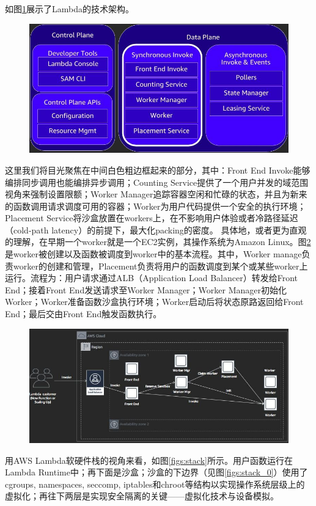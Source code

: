 \documentclass[11pt]{article}
\begin{document}
如图\ref{figs:block}展示了Lambda的技术架构。
\begin{figure}[!htbp]
	\centering
	\includegraphics[width=0.6\linewidth]{figs/internal}
	\caption{}
	\label{figs:block}
\end{figure}
这里我们将目光聚焦在中间白色粗边框起来的部分，其中：Front End Invoke能够编排同步调用也能编排异步调用；Counting Service提供了一个用户并发的域范围视角来强制设置限额；Worker Manager追踪容器空闲和忙碌的状态，并且为新来的函数调用请求调度可用的容器；Worker为用户代码提供一个安全的执行环境；Placement Service将沙盒放置在workers上，在不影响用户体验或者冷路径延迟（cold-path latency）的前提下，最大化packing的密度。
具体地，或者更为直观的理解，在早期一个worker就是一个EC2实例，其操作系统为Amazon Linux。图\ref{figs:worker}是worker被创建以及函数被调度到worker中的基本流程。其中，Worker manage负责worker的创建和管理，Placement负责将用户的函数调度到某个或某些worker上运行。流程为：用户请求通过ALB（Application Load Balancer）转发给Front End；接着Front End发送请求至Worker Manager；Worker Manager初始化Worker；Worker准备函数沙盒执行环境；Worker启动后将状态原路返回给Front End；最后交由Front End触发函数执行。
\begin{figure}[!htbp]
	\centering
	\includegraphics[width=0.8\linewidth]{figs/worker}
	\caption{}
	\label{figs:worker}
\end{figure}
用AWS Lambda软硬件栈的视角来看，如图\ref{figs:stack}所示。用户函数运行在Lambda Runtime中；再下面是沙盒；沙盒的下边界（见图\ref{figs:stack_0}）使用了cgroups, namespaces, seccomp, iptables和chroot等结构以实现操作系统层级上的虚拟化；再往下两层是实现安全隔离的关键——虚拟化技术与设备模拟。
\end{document}
